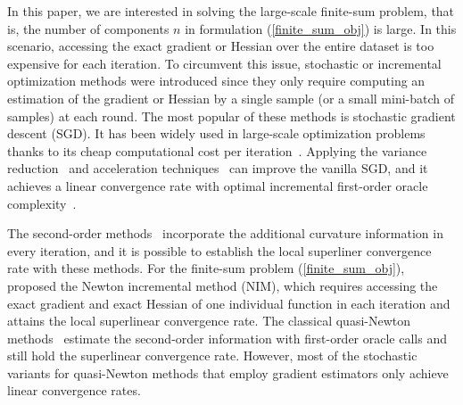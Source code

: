\documentclass[letterpaper]{article} %
\theoremstyle{plain}
\theoremstyle{definition}
\theoremstyle{remark}
\begin{document}
In this paper, we are interested in solving the large-scale finite-sum problem, that is, the number of components $n$ in formulation (\ref{finite_sum_obj}) is large.
In this scenario, accessing the exact gradient or Hessian over the entire dataset is too expensive for each iteration. 
To circumvent this issue, stochastic or incremental optimization methods were introduced since they only require computing an estimation of the gradient or Hessian by a single sample (or a small mini-batch of samples) at each round.
The most popular of these methods is stochastic gradient descent (SGD). 
It has been widely used in large-scale optimization problems thanks to its cheap computational cost per iteration~\cite{bottou2018optimization}.
Applying the variance reduction~\cite{schmidt2017minimizing,johnson2013accelerating, defazio2014saga,zhang2013linear} and acceleration techniques~\cite{nesterov2003introductory,allen2017katyusha} can improve the vanilla SGD, and it achieves a linear convergence rate with optimal incremental first-order oracle complexity~\cite{woodworth2016tight}. 





The second-order methods~\cite{nesterov2003introductory} incorporate the additional curvature information in every iteration, and it is possible to establish the local superliner convergence rate with these methods.
For the finite-sum problem (\ref{finite_sum_obj}), \citet{rodomanov2016superlinearly} proposed the Newton incremental method (NIM), which requires accessing the exact gradient and exact Hessian of one individual function in each iteration and attains the local superlinear convergence rate. 
The classical quasi-Newton methods~\cite{broyden1973local, dennis1974characterization,powell1971convergence} estimate the second-order information %
with first-order oracle calls and still hold the superlinear convergence rate.
However, most of the stochastic variants for quasi-Newton methods \cite{lucchi2015variance, moritz2016linearly} that employ gradient estimators only achieve linear convergence rates. 
\end{document}
